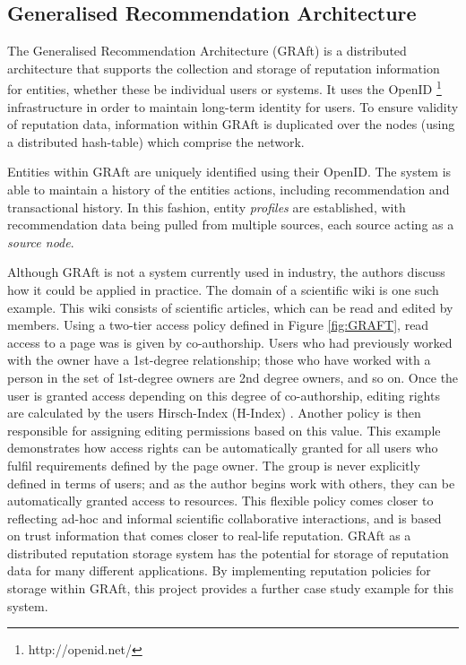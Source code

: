 \subsection{Generalised Recommendation Architecture}

The Generalised Recommendation Architecture (GRAft) \cite{graft_paper} is a distributed architecture that supports the collection and storage of reputation information for entities, whether these be individual users or systems. It uses the OpenID \footnote{http://openid.net/} infrastructure in order to maintain long-term identity for users. To ensure validity of reputation data, information within GRAft is duplicated over the nodes (using a distributed hash-table) which comprise the network. 

Entities within GRAft are uniquely identified using their OpenID. The system is able to maintain a history of the entities actions, including recommendation and transactional history. In this fashion, entity \textit{profiles} are established, with recommendation data being pulled from multiple sources, each source acting as a \textit{source node}.



Although GRAft is not a system currently used in industry, the authors discuss how it could be applied in practice. The domain of a scientific wiki is one such example. This wiki consists of scientific articles, which can be read and edited by members. Using a two-tier access policy defined in Figure \ref{fig:GRAFT}, read access to a page was is given by co-authorship. Users who had previously worked with the owner have a 1st-degree relationship; those who have worked with a person in the set of 1st-degree owners are 2nd degree owners, and so on. Once the user is granted access depending on this degree of co-authorship, editing rights are calculated by the users Hirsch-Index (H-Index) \cite{hirsch2005index}. Another policy is then responsible for assigning editing permissions based on this value. This example demonstrates how access rights can be automatically granted for all users who fulfil requirements defined by the page owner. The group is never explicitly defined in terms of users; and as the author 
begins work with others, they can be automatically granted access to resources. This flexible policy comes closer to reflecting ad-hoc and informal scientific collaborative interactions, and is based on trust information that comes closer to real-life reputation. GRAft as a distributed reputation storage system has the potential for storage of reputation data for many different applications. By implementing reputation policies for storage within GRAft, this project provides a further case study example for this system.

